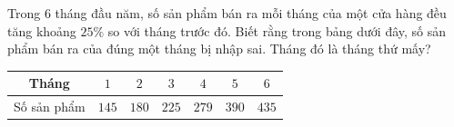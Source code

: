 \begin{ex}
Trong $6$ tháng đầu năm, số sản phẩm bán ra mỗi tháng của một cửa hàng đều tăng khoảng $25\%$ so với tháng trước đó. Biết rằng trong bảng dưới đây, số sản phẩm bán ra của đúng một tháng bị nhập sai. Tháng đó là tháng thứ mấy?
\begin{center}
\begin{tabular}{|c|c|c|c|c|c|c|}\hline
Tháng & $1$ & $2$ & $3$ & $4$ & $5$ & $6$\\\hline
Số sản phẩm & $145$ & $180$ & $225$ & $279$ & $390$ & $435$\\\hline
\end{tabular}
\end{center}
\end{ex}
